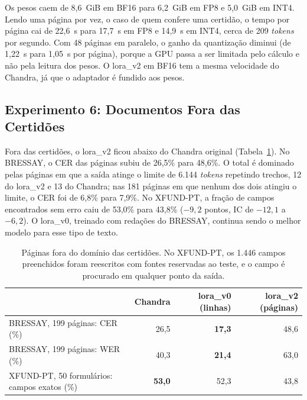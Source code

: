 \documentclass[12pt,a4paper]{article}
\begin{document}
Os pesos caem de 8,6~GiB em BF16 para 6,2~GiB em FP8 e 5,0~GiB em INT4. Lendo uma página por vez, o caso de quem confere uma certidão, o tempo por página cai de 22,6~s para 17,7~s em FP8 e 14,9~s em INT4, cerca de 209 \emph{tokens} por segundo. Com 48 páginas em paralelo, o ganho da quantização diminui (de 1,22~s para 1,05~s por página), porque a GPU passa a ser limitada pelo cálculo e não pela leitura dos pesos. O lora\_v2 em BF16 tem a mesma velocidade do Chandra, já que o adaptador é fundido aos pesos.

\subsection{Experimento 6: Documentos Fora das Certidões}
\label{subsec:exp6}

Fora das certidões, o lora\_v2 ficou abaixo do Chandra original (Tabela~\ref{tab:real}). No BRESSAY, o CER das páginas subiu de 26,5\% para 48,6\%. O total é dominado pelas páginas em que a saída atinge o limite de 6.144 \emph{tokens} repetindo trechos, 12 do lora\_v2 e 13 do Chandra; nas 181 páginas em que nenhum dos dois atingiu o limite, o CER foi de 6,8\% para 7,9\%. No XFUND-PT, a fração de campos encontrados sem erro caiu de 53,0\% para 43,8\% ($-9{,}2$ pontos, IC de $-12{,}1$ a $-6{,}2$). O lora\_v0, treinado com redações do BRESSAY, continua sendo o melhor modelo para esse tipo de texto.

\begin{table}[H]
\centering
\small
\begin{tabular}{@{}lrrr@{}}
\toprule
& Chandra & lora\_v0 (linhas) & lora\_v2 (páginas) \\
\midrule
BRESSAY, 199 páginas: CER (\%) & 26,5 & \textbf{17,3} & 48,6 \\
BRESSAY, 199 páginas: WER (\%) & 40,3 & \textbf{21,4} & 63,0 \\
XFUND-PT, 50 formulários: campos exatos (\%) & \textbf{53,0} & 52,3 & 43,8 \\
\bottomrule
\end{tabular}
\caption{Páginas fora do domínio das certidões. No XFUND-PT, os 1.446 campos preenchidos foram reescritos com fontes reservadas ao teste, e o campo é procurado em qualquer ponto da saída.}
\label{tab:real}
\end{table}

\end{document}

